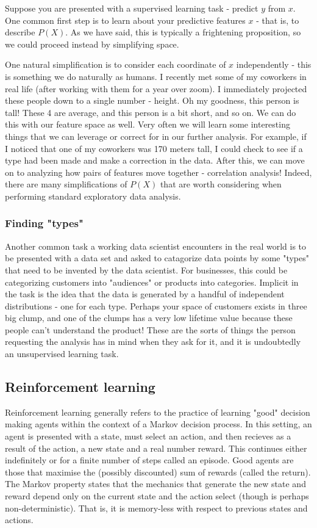 \documentclass{article}
\begin{document}
Suppose you are presented with a supervised learning task - predict $y$ from $x$. One common first step is to learn about your predictive features $x$ - that is, to describe $P(X)$. As we have said, this is typically a frightening proposition, so we could proceed instead by simplifying space.

One natural simplification is to consider each coordinate of $x$ independently - this is something we do naturally as humans. I recently met some of my coworkers in real life (after working with them for a year over zoom). I immediately projected these people down to a single number - height. Oh my goodness, this person is tall! These 4 are average, and this person is a bit short, and so on. We can do this with our feature space as well. Very often we will learn some interesting things that we can leverage or correct for in our further analysis. For example, if I noticed that one of my coworkers was 170 meters tall, I could check to see if a type had been made and make a correction in the data. After this, we can move on to analyzing how pairs of features move together - correlation analysis! Indeed, there are many simplifications of $P(X)$ that are worth considering when performing standard exploratory data analysis.

\subsubsection{Finding "types"}

Another common task a working data scientist encounters in the real world is to be presented with a data set and asked to catagorize data points by some "types" that need to be invented by the data scientist. For businesses, this could be categorizing customers into "audiences" or products into categories. Implicit in the task is the idea that the data is generated by a handful of independent distributions - one for each type. Perhaps your space of customers exists in three big clump, and one of the clumps has a very low lifetime value because these people can't understand the product! These are the sorts of things the person requesting the analysis has in mind when they ask for it, and it is undoubtedly an unsupervised learning task.

\subsection{Reinforcement learning}

Reinforcement learning generally refers to the practice of learning "good" decision making agents within the context of a Markov decision process. In this setting, an agent is presented with a state, must select an action, and then recieves as a result of the action, a new state and a real number reward. This continues either indefinitely or for a finite number of steps called an episode. Good agents are those that maximise the (possibly discounted) sum of rewards (called the return). The Markov property states that the mechanics that generate the new state and reward depend only on the current state and the action select (though is perhaps non-deterministic). That is, it is memory-less with respect to previous states and actions.
\end{document}

